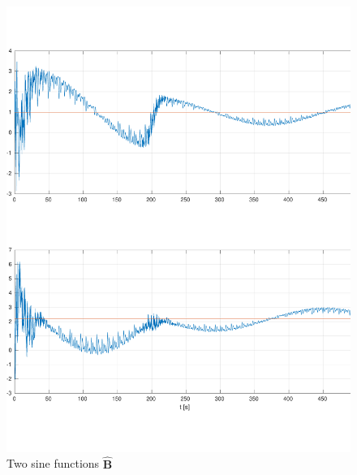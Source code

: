 \documentclass[]{article}
\begin{document}
\begin{figure}[H]
\centering
\includegraphics[width=1\columnwidth]{two_sine_B.pdf}
\caption{Two sine functions $\mathbf{\hat B}$}
\label{fig:two_sine_B}
\end{figure}
\end{document}
